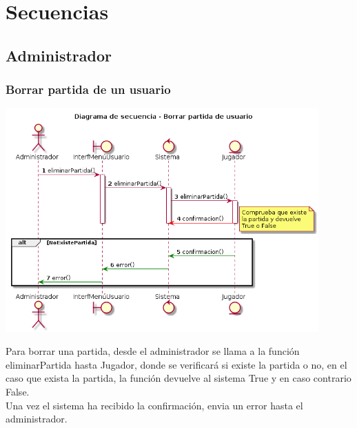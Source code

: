 \section{Secuencias}\label{sec:uc0}


\subsection{Administrador}\label{sec:uc0}
\subsubsection{Borrar partida de un usuario}
\begin{center}
	  \includegraphics[width=0.9\textwidth]{./imatges/administrador/Borrar_partida_de_usuario.png}
\end{center}
Para borrar una partida, desde el administrador se llama a la función eliminarPartida hasta Jugador, donde se verificará si existe la partida o no, en el caso que exista la partida, la función devuelve al sistema True y en caso contrario False. \\
	Una vez el sistema ha recibido la confirmación, envia un error hasta el administrador.

